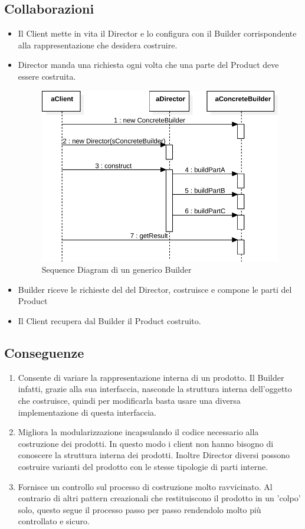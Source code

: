 \subsection{Collaborazioni}
\begin{itemize}
\item Il Client mette in vita il Director e lo configura con il Builder corrispondente alla rappresentazione che desidera costruire.
\item Director manda una richiesta ogni volta che una parte del Product deve essere costruita.
\begin{figure}[htbp]
\centering
\includegraphics[width=\textwidth,height=\textheight,keepaspectratio]{images/builder-pattern-sequence.pdf}
\caption{Sequence Diagram di un generico Builder}
\label{fig:builder-pattern-sequence}
\end{figure}
\item Builder riceve le richieste del del Director, costruisce e compone le parti del Product
\item Il Client recupera dal Builder il Product costruito.
\end{itemize}

\subsection{Conseguenze}
\begin{enumerate}
\item Consente di variare la rappresentazione interna di un prodotto. Il Builder infatti, grazie alla sua interfaccia, nasconde la struttura interna dell'oggetto che costruisce, quindi per modificarla basta usare una diversa implementazione di questa interfaccia.
\item Migliora la modularizzazione incapsulando il codice necessario alla costruzione dei prodotti. In questo modo i client non hanno bisogno di conoscere la struttura interna dei prodotti. Inoltre Director diversi possono costruire varianti del prodotto con le stesse tipologie di parti interne.
\item Fornisce un controllo sul processo di costruzione molto ravvicinato. Al contrario di altri pattern creazionali che restituiscono il prodotto in un 'colpo' solo, questo segue il processo passo per passo rendendolo molto più controllato e sicuro.
\end{enumerate}

